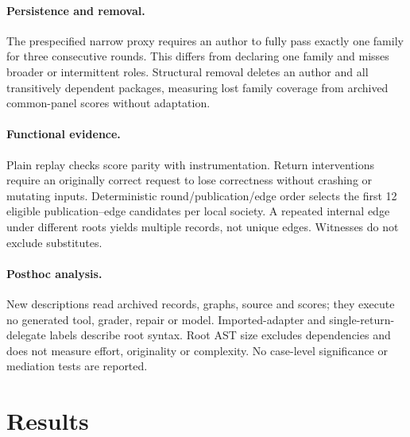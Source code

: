 \documentclass[sigconf,anonymous]{aamas}
\begin{document}
\paragraph{Persistence and removal.} The prespecified narrow proxy requires an author to fully pass exactly one family for three consecutive rounds. This differs from declaring one family and misses broader or intermittent roles. Structural removal deletes an author and all transitively dependent packages, measuring lost family coverage from archived common-panel scores without adaptation.

\paragraph{Functional evidence.} Plain replay checks score parity with instrumentation. Return interventions require an originally correct request to lose correctness without crashing or mutating inputs. Deterministic round/publication/edge order selects the first 12 eligible publication--edge candidates per local society. A repeated internal edge under different roots yields multiple records, not unique edges. Witnesses do not exclude substitutes.

\paragraph{Posthoc analysis.} New descriptions read archived records, graphs, source and scores; they execute no generated tool, grader, repair or model. Imported-adapter and single-return-delegate labels describe root syntax. Root AST size excludes dependencies and does not measure effort, originality or complexity. No case-level significance or mediation tests are reported.

\section{Results}\label{sec:results}
\begin{table}[t]
\centering\small\setlength{\tabcolsep}{4.5pt}

\caption{All nine societies, each with 48 opportunities. Adoption is adopting publications divided by admitted publications after round one. Cross cases count correct foreign-tool requests, not distinct cooperative events. Own-six counts authors whose self-contained history passes all six families on the common fresh panel. Gain is Equation~\ref{eq:gap} at round six. All-six counts broad offerings; it is not a division-of-labour quality score. Colors have the same meaning throughout.}
\label{tab:all}
\end{table}
\end{document}
